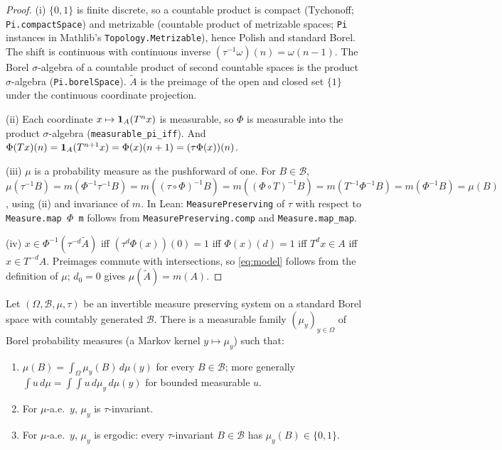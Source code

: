 \begin{proof}
  (i) $\{0,1\}$ is finite discrete, so a countable product is compact (Tychonoff;
  \texttt{Pi.compactSpace}) and metrizable (countable product of metrizable spaces;
  \texttt{Pi} instances in Mathlib's \texttt{Topology.Metrizable}), hence Polish and standard
  Borel.  The shift is continuous with continuous inverse $(\tau^{-1}\omega)(n) = \omega(n-1)$.
  The Borel $\sigma$-algebra of a countable product of second countable spaces is the product
  $\sigma$-algebra (\texttt{Pi.borelSpace}).  $\widetilde A$ is the preimage of the open and
  closed set $\{1\}$ under the continuous coordinate projection.

  (ii) Each coordinate $x \mapsto \mathbf{1}_A(T^nx)$ is measurable, so $\Phi$ is measurable into the
  product $\sigma$-algebra (\texttt{measurable\_pi\_iff}).  And
  $\Phi(Tx)(n) = \mathbf{1}_A(T^{n+1}x) = \Phi(x)(n+1) = (\tau\Phi(x))(n)$.

  (iii) $\mu$ is a probability measure as the pushforward of one.  For $B \in \mathcal B$,
  $\mu(\tau^{-1}B) = m(\Phi^{-1}\tau^{-1}B) = m((\tau\circ\Phi)^{-1}B) = m((\Phi\circ T)^{-1}B)
   = m(T^{-1}\Phi^{-1}B) = m(\Phi^{-1}B) = \mu(B)$, using (ii) and invariance of $m$.  In Lean:
  \texttt{MeasurePreserving} of $\tau$ with respect to \texttt{Measure.map \ensuremath{\Phi} m}
  follows from \texttt{MeasurePreserving.comp} and \texttt{Measure.map\_map}.

  (iv) $x \in \Phi^{-1}(\tau^{-d}\widetilde A)$ iff $(\tau^d\Phi(x))(0) = 1$ iff
  $\Phi(x)(d) = 1$ iff $T^dx \in A$ iff $x \in T^{-d}A$.  Preimages commute with
  intersections, so \eqref{eq:model} follows from the definition of $\mu$; $d_0 = 0$ gives
  $\mu(\widetilde A) = m(A)$.
\end{proof}

\begin{lemma}
  \label{lem:ergodic-decomposition}
  \leanok
  Let $(\Omega,\mathcal B,\mu,\tau)$ be an invertible measure preserving system on a standard
  Borel space with countably generated $\mathcal B$.  There is a measurable family
  $(\mu_y)_{y \in \Omega}$ of Borel probability measures (a Markov kernel $y \mapsto \mu_y$)
  such that:
  \begin{enumerate}
    \item[(i)] $\mu(B) = \int_\Omega \mu_y(B)\,d\mu(y)$ for every $B \in \mathcal B$; more
      generally $\int u\,d\mu = \int\!\!\int u\,d\mu_y\,d\mu(y)$ for bounded measurable $u$.
    \item[(ii)] For $\mu$-a.e.\ $y$, $\mu_y$ is $\tau$-invariant.
    \item[(iii)] For $\mu$-a.e.\ $y$, $\mu_y$ is ergodic: every $\tau$-invariant $B \in \mathcal B$
      has $\mu_y(B) \in \{0,1\}$.
  \end{enumerate}
\end{lemma}

